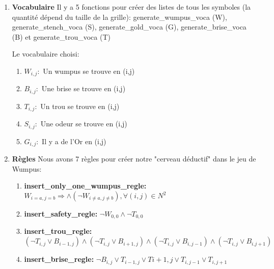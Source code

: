 \documentclass{article}
\begin{document}
\begin{enumerate}
\item \textbf{Vocabulaire}
Il y a 5 fonctions pour créer des listes de tous les symboles (la quantité dépend du taille de la grille): generate\_wumpus\_voca (W), generate\_stench\_voca (S), generate\_gold\_voca (G), generate\_brise\_voca (B) et generate\_trou\_voca (T)

Le vocabulaire choisi:

\begin{enumerate}
\item \textbf{$W_{i,j}:$} Un wumpus se trouve en (i,j) \newline  
\item \textbf{$B_{i,j}:$} Une brise se trouve en (i,j) \newline  
\item \textbf{$T_{i,j}:$} Un trou se trouve en (i,j) \newline  
\item \textbf{$S_{i,j}:$} Une odeur se trouve en (i,j) \newline
\item \textbf{$G_{i,j}:$} Il y a de l'Or en (i,j) \newline  

\end{enumerate}

\newline  \newline
\item \textbf{Règles}
Nous avons 7 règles pour créer notre "cerveau déductif" dans le jeu de Wumpus: 

\begin{enumerate}
\item \textbf{insert\_only\_one\_wumpus\_regle:} $W_{i=a,j=b} \Rightarrow \land (\neg W_{i\ne a,j\ne b}), \forall (i, j) \in N^{2}$ \newline

\item \textbf{insert\_safety\_regle:} $\neg W_{0,0} \land  \neg T_{0,0}$ \newline

\item \textbf{insert\_trou\_regle:} $(\neg T_{i,j} \lor B_{i-1,j}) \land (\neg T_{i,j} \lor B_{i+1,j}) \land (\neg T_{i,j} \lor B_{i,j-1}) \land (\neg T_{i,j} \lor B_{i.j+1})$ \newline

\item \textbf{insert\_brise\_regle:} $ \neg B_{i,j} \lor T_{i-1,j} \lor T{i+1,j} \lor T_{i,j-1} \lor T_{i,j+1}$ \newline


\end{enumerate}
\end{enumerate}
\end{document}
